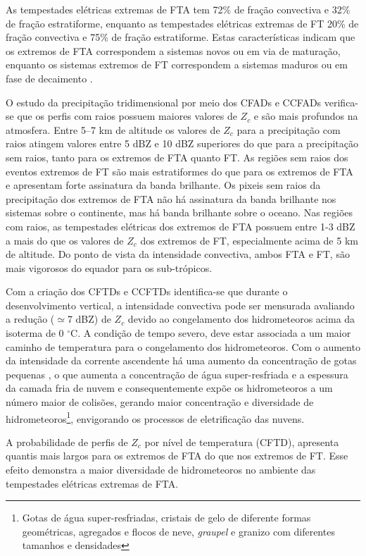 As tempestades elétricas extremas de FTA tem 72\% de fração convectiva e 32\% de fração estratiforme, enquanto as tempestades elétricas extremas de FT 20\% de fração convectiva e 75\% de fração estratiforme. Estas características indicam que os extremos de FTA correspondem a sistemas novos ou em via de maturação, enquanto os sistemas extremos de FT correspondem a sistemas maduros ou em fase de decaimento \cite{learyHouse1979}. 

O estudo da precipitação tridimensional por meio dos CFADs e CCFADs verifica-se que os perfis com raios possuem maiores valores de  $Z_c$ e são mais profundos na atmosfera. Entre 5--7 km de altitude os valores de $Z_c$ para a precipitação com raios atingem valores entre 5 dBZ e 10 dBZ superiores do que para a precipitação sem raios, tanto para os extremos de FTA quanto FT. As regiões sem raios dos eventos extremos de FT são mais estratiformes do que para os extremos de FTA e apresentam forte assinatura da banda brilhante. Os pixeis sem raios da precipitação dos extremos de FTA não há assinatura da banda brilhante nos sistemas sobre o continente, mas há banda brilhante sobre o oceano. Nas regiões com raios, as tempestades elétricas dos extremos de FTA possuem entre 1-3 dBZ a mais do que os valores de $Z_c$ dos extremos de FT, especialmente acima de 5 km de altitude. Do ponto de vista da intensidade convectiva, ambos FTA e FT, são mais vigorosos do equador para os sub-trópicos. 


Com a criação dos CFTDs e CCFTDs identifica-se que durante o desenvolvimento vertical, a intensidade convectiva pode ser mensurada avaliando a redução ($\simeq$7 dBZ) de $Z_c$ devido ao congelamento dos hidrometeoros acima da isoterma de 0 $^{\circ}$C. A condição de tempo severo, deve estar associada a um maior caminho de temperatura para o congelamento dos hidrometeoros. Com o aumento da intensidade da corrente ascendente há uma aumento da  concentração de gotas pequenas \cite{bigg1953}, o que aumenta a concentração de água super-resfriada e a espessura da camada fria de nuvem e consequentemente expõe os hidrometeoros a um número maior de colisões, gerando maior concentração e diversidade de hidrometeoros\footnote{Gotas de água super-resfriadas, cristais de gelo de diferente formas geométricas, agregados e flocos de neve, \textit{graupel} e granizo com diferentes tamanhos e densidades}, envigorando os processos de eletrificação das nuvens.  

A probabilidade de perfis de $Z_c$ por nível de temperatura (CFTD), apresenta quantis mais largos para os extremos de FTA do que nos extremos de FT. Esse efeito demonstra a maior diversidade de hidrometeoros no ambiente das tempestades elétricas extremas de FTA.    

